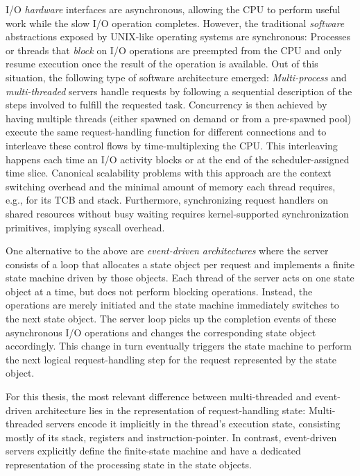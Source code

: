 \documentclass[12pt,a4paper]{book}
\begin{document}
I/O \emph{hardware} interfaces are asynchronous, allowing the CPU to perform useful work while the slow I/O operation completes.
However, the traditional \emph{software} abstractions exposed by UNIX-like operating systems are synchronous:
Processes or threads that \emph{block} on I/O operations are preempted from the CPU and only resume execution once the result of the operation is available.
Out of this situation, the following type of software architecture emerged:
\emph{Multi-process} and \emph{multi-threaded} servers handle requests by following a sequential description of the steps involved to fulfill the requested task.
Concurrency is then achieved by having multiple threads (either spawned on demand or from a pre-spawned pool) execute the same request-handling function for different connections and to interleave these control flows by time-multiplexing the CPU.
This interleaving happens each time an I/O activity blocks or at the end of the scheduler-assigned time slice.
Canonical scalability problems with this approach are the context switching overhead and the minimal amount of memory each thread requires, e.g., for its TCB and stack.
Furthermore, synchronizing request handlers on shared resources without busy waiting requires kernel-supported synchronization primitives, implying syscall overhead.~\cite{flashwebsrv,c10k,andersonThreads,seda}

One alternative to the above are \emph{event-driven architectures} where the server consists of a loop that allocates a state object per request and implements a finite state machine driven by those objects.
Each thread of the server acts on one state object at a time, but does not perform blocking operations.
Instead, the operations are merely initiated and the state machine immediately switches to the next state object.
The server loop picks up the completion events of these asynchronous I/O operations and changes the corresponding state object accordingly.
This change in turn eventually triggers the state machine to perform the next logical request-handling step for the request represented by the state object.~\cite{flashwebsrv,seda,c10k}

For this thesis, the most relevant difference between multi-threaded and event-driven architecture lies in the representation of request-handling state:
Multi-threaded servers encode it implicitly in the thread's execution state, consisting mostly of its stack, registers and instruction-pointer.
In contrast, event-driven servers explicitly define the finite-state machine and have a dedicated representation of the processing state in the state objects.
\end{document}
